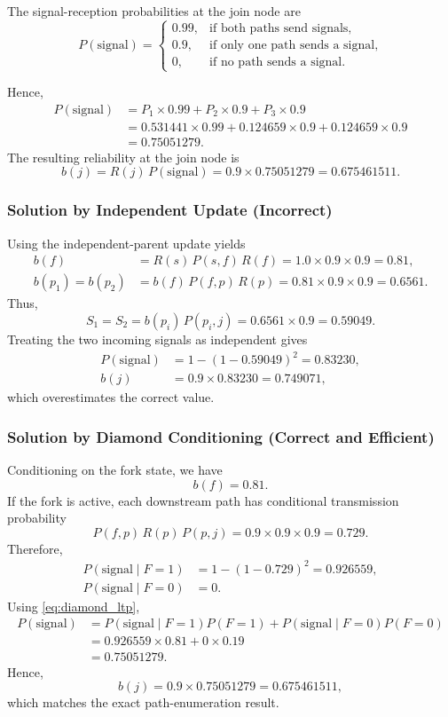 \documentclass[preprint,12pt]{elsarticle}
\begin{document}
The signal-reception probabilities at the join node are
\[
P(\text{signal}) =
\begin{cases}
0.99, & \text{if both paths send signals}, \\
0.9,  & \text{if only one path sends a signal}, \\
0,    & \text{if no path sends a signal}.
\end{cases}
\]

Hence,
\begin{align*}
P(\text{signal})
&= P_1 \times 0.99 + P_2 \times 0.9 + P_3 \times 0.9 \\
&= 0.531441 \times 0.99 + 0.124659 \times 0.9 + 0.124659 \times 0.9 \\
&= 0.75051279.
\end{align*}
The resulting reliability at the join node is
\[
b(j)=R(j)\,P(\text{signal})=0.9 \times 0.75051279 = 0.675461511.
\]

\subsubsection{Solution by Independent Update (Incorrect)}

Using the independent-parent update yields
\begin{align*}
b(f) &= R(s)\,P(s,f)\,R(f) = 1.0 \times 0.9 \times 0.9 = 0.81, \\
b(p_1)=b(p_2) &= b(f)\,P(f,p)\,R(p) = 0.81 \times 0.9 \times 0.9 = 0.6561.
\end{align*}
Thus,
\[
S_1 = S_2 = b(p_i)\,P(p_i,j) = 0.6561 \times 0.9 = 0.59049.
\]
Treating the two incoming signals as independent gives
\begin{align*}
P(\text{signal}) &= 1-(1-0.59049)^2 = 0.83230, \\
b(j) &= 0.9 \times 0.83230 = 0.749071,
\end{align*}
which overestimates the correct value.

\subsubsection{Solution by Diamond Conditioning (Correct and Efficient)}

Conditioning on the fork state, we have
\[
b(f)=0.81.
\]
If the fork is active, each downstream path has conditional transmission probability
\[
P(f,p)\,R(p)\,P(p,j)=0.9 \times 0.9 \times 0.9 = 0.729.
\]
Therefore,
\begin{align*}
P(\text{signal}\mid F=1) &= 1-(1-0.729)^2 = 0.926559, \\
P(\text{signal}\mid F=0) &= 0.
\end{align*}
Using \eqref{eq:diamond_ltp},
\begin{align*}
P(\text{signal})
&= P(\text{signal}\mid F=1)P(F=1) + P(\text{signal}\mid F=0)P(F=0) \\
&= 0.926559 \times 0.81 + 0 \times 0.19 \\
&= 0.75051279.
\end{align*}
Hence,
\[
b(j)=0.9 \times 0.75051279 = 0.675461511,
\]
which matches the exact path-enumeration result.
\end{document}
